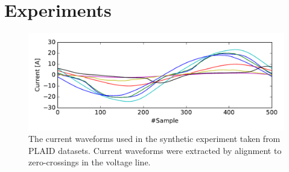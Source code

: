\section{Experiments}
\label{subsec_exp}
\begin{figure}
\centering
\includegraphics[width=0.9\linewidth]{factornet/waveforms.pdf}
\caption[FactorNet: The current waveforms used in the synthetic experiment taken from PLAID datasets.]{The current waveforms used in the synthetic experiment taken from PLAID datasets. Current waveforms were extracted by alignment to zero-crossings in the voltage line.}
\label{fig_waveforms}
\end{figure}

